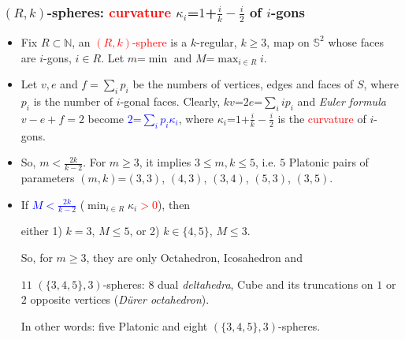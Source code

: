 \documentclass{beamer}
\begin{document}



\begin{frame}\frametitle{$(R,k)$-spheres:  
 \textcolor{red}{curvature} $\kappa_i$=$1$+$\frac{i}{k}-\frac{i}{2}$
of  $i$-gons}
\vspace{-2mm}
\begin{itemize}
\item Fix $R\subset \mathbb{N}$, an  \textcolor{red}{$(R,k)$-sphere}  is 
a $k$-regular, $k\ge 3$,  map on 
$\mathbb{S}^2$ 
whose faces are $i$-gons,
$i\in R$. Let $m$=$\min$
 and $M$=$\max_{i\in R}i$.
 

\item Let $v,e$ and $f=\sum_{i}p_i$ be the numbers of 
vertices, edges and faces of $S$, where $p_i$ is the number 
of $i$-gonal faces. 
Clearly,
$kv$=$2e$=$\sum_{i}ip_i$ and  
 {\em Euler formula $v-e+f=2$}
become   \textcolor{blue}{$2$=$\sum_{i}p_i\kappa_i$}, where 
$\kappa_i$=$1$+$\frac{i}{k}-\frac{i}{2}$ is 
the \textcolor{red}{curvature} of $i$-gons.

\item So, $m$$<$$\frac{2k}{k-2}$.
For $m$$\ge$$3$, 
 it implies $3\le m,k\le 5$,
i.e.  $5$ Platonic pairs of parameters
$(m,k)$=$(3,3)$, $(4,3)$, $(3,4)$, $(5,3)$, $(3,5)$.

\item If \textcolor{blue}{$M$$<$$\frac{2k}{k-2}$} ($\min_{i\in 
R}\kappa_i$\textcolor{red}{$>0$}),  then 

either  
1) $k=3$, $M\le5$,  or 2) $k\in\{4,5\}$,  $M\le3$.

So, for $m\ge 3$, they are only 
Octahedron, 
Icosahedron and 

$11$ $(\{3,4,5\},3)$-spheres: $8$ dual 
 {\em deltahedra}, Cube and its truncations on $1$ or $2$ 
opposite vertices ({\em D\"{u}rer octahedron}).

In other words: five Platonic  and eight $(\{3,4,5\},3)$-spheres.
\end{itemize}\end{frame}
\end{document}
